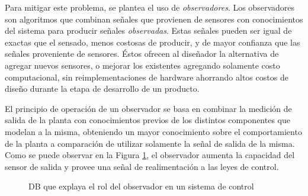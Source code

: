 \noindent Para mitigar este problema, se plantea el uso de \emph{observadores}. 
Los observadores son algoritmos que combinan señales que provienen de sensores 
con conocimientos del sistema para producir señales \emph{observadas}. 
Estas señales pueden ser igual de exactas que el sensado, menos costosas de 
producir, y de mayor confianza que las señales proveniente de sensores. 
\'Estos ofrecen al diseñador la alternativa de agregar nuevos sensores, o 
mejorar los existentes agregando solamente costo computacional, sin 
reimplementaciones de hardware ahorrando altos costos de diseño durante la
etapa de desarrollo de un producto.

\noindent El principio de operaci\'on de un observador se basa en combinar la
medici\'on de salida de la planta con conocimientos previos de los distintos 
componentes que modelan a la misma, obteniendo un mayor conocimiento sobre el 
comportamiento de la planta a comparaci\'on de utilizar solamente la señal de 
salida de la misma. Como se puede observar en la Figura \ref{role_observer}, el 
observador aumenta la capacidad del sensor de salida y provee una señal de 
realimentaci\'on a las leyes de control.

\begin{figure}[h!]
    \begin{center}
    \caption{\acrshort{DB} que explaya el rol del observador en un sistema de control}
    \label{role_observer}
    \end{center}
\end{figure}
\FloatBarrier

